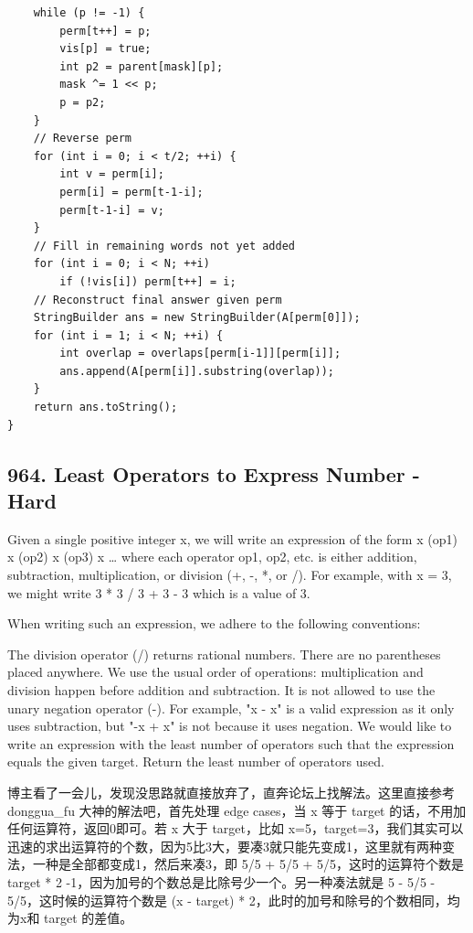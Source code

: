 \documentclass[9pt, b5paaper]{book}
\begin{document}
\begin{enumerate}
\begin{verbatim}
    while (p != -1) {
        perm[t++] = p;
        vis[p] = true;
        int p2 = parent[mask][p];
        mask ^= 1 << p;
        p = p2;
    }
    // Reverse perm
    for (int i = 0; i < t/2; ++i) {
        int v = perm[i];
        perm[i] = perm[t-1-i];
        perm[t-1-i] = v;
    }
    // Fill in remaining words not yet added
    for (int i = 0; i < N; ++i)
        if (!vis[i]) perm[t++] = i;
    // Reconstruct final answer given perm
    StringBuilder ans = new StringBuilder(A[perm[0]]);
    for (int i = 1; i < N; ++i) {
        int overlap = overlaps[perm[i-1]][perm[i]];
        ans.append(A[perm[i]].substring(overlap));
    }
    return ans.toString();
}
\end{verbatim}
\end{enumerate}
\subsection{964. Least Operators to Express Number - Hard}
\label{sec-1-4-57}
Given a single positive integer x, we will write an expression of the form x (op1) x (op2) x (op3) x \ldots{} where each operator op1, op2, etc. is either addition, subtraction, multiplication, or division (+, -, *, or /). For example, with x = 3, we might write 3 * 3 / 3 + 3 - 3 which is a value of 3.

When writing such an expression, we adhere to the following conventions:

The division operator (/) returns rational numbers.
There are no parentheses placed anywhere.
We use the usual order of operations: multiplication and division happen before addition and subtraction.
It is not allowed to use the unary negation operator (-). For example, "x - x" is a valid expression as it only uses subtraction, but "-x + x" is not because it uses negation.
We would like to write an expression with the least number of operators such that the expression equals the given target. Return the least number of operators used.

博主看了一会儿，发现没思路就直接放弃了，直奔论坛上找解法。这里直接参考 donggua\_fu 大神的解法吧，首先处理 edge cases，当 x 等于 target 的话，不用加任何运算符，返回0即可。若 x 大于 target，比如 x=5，target=3，我们其实可以迅速的求出运算符的个数，因为5比3大，要凑3就只能先变成1，这里就有两种变法，一种是全部都变成1，然后来凑3，即 5/5 + 5/5 + 5/5，这时的运算符个数是 target * 2 -1，因为加号的个数总是比除号少一个。另一种凑法就是 5 - 5/5 - 5/5，这时候的运算符个数是 (x - target) * 2，此时的加号和除号的个数相同，均为x和 target 的差值。
\end{document}
